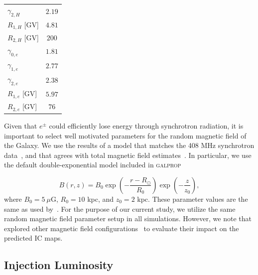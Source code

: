 \documentclass[doublespace,nopageskip]{VTthesis} %
\begin{document}
\begin{table}[htb!]
\begin{tabular}{lc}
$\gamma_{2,H}$                        & $2.19$\\
$R_{1,H}$ [GV]                        & $4.81$\\
$R_{2,H}$ [GV]                        & $200$\\
$\gamma_{0,e}$                        & $1.81$\\
$\gamma_{1,e}$                        & $2.77$\\
$\gamma_{2,e}$                        & $2.38$\\
$R_{1,e}$ [GV]                        & $5.97$\\
$R_{2,e}$ [GV]                        & $76$\\\hline\hline
\end{tabular}
\label{tab:galpropsetup}
\end{table}

Given that $e^{\pm}$ could efficiently lose energy through synchrotron radiation, it is important to select well motivated parameters for the random magnetic field of the Galaxy. We use the results of a model that matches the 408 MHz synchrotron data~\citep{2000ApJ...537..763S}, and that agrees with total magnetic field estimates~\citep{1995ASPC...80..507H,2001SSRv...99..243B}. In particular, we use the default double-exponential model included in \textsc{galprop} 

\begin{equation}\label{eq:Bfield}
	B(r,z) = B_0 \exp{\left(-\dfrac{r-R_\odot}{R_0}\right)}\exp{\left(-\dfrac{z}{z_0}\right)},
\end{equation}
where $B_0 = 5\ \mu$G, $R_0 = 10$ kpc, and $z_0 = 2$ kpc. These parameter values are the same as used by~\citet{2018ApJ...856...45J}. For the purpose of our current study, we utilize the same random magnetic field parameter setup in all simulations. However, 
we note that \cite{2019PhRvD..99l3020S} explored other magnetic field configurations~\citep{2010Natur.463...65C} to evaluate their impact on the predicted IC maps. 



\subsection{Injection Luminosity}
\end{document}
